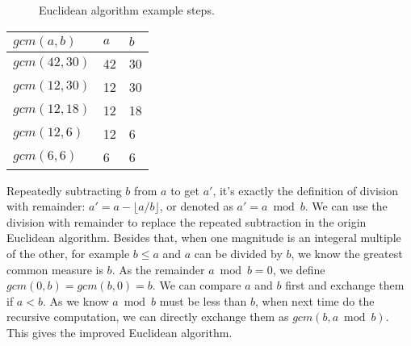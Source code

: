 \documentclass{article}
\begin{document}
\begin{figure}[htbp]
\centering
{}
\caption{Euclidean algorithm example steps.}
\label{fig:line-seg-gcm}
\end{figure}

\begin{tabular}{|l|l|l|}
\hline
$gcm(a, b)$ & $a$ & $b$ \\
\hline
$gcm(42, 30)$ & 42 & 30 \\
\hline
$gcm(12, 30)$ & 12 & 30 \\
\hline
$gcm(12, 18)$ & 12 & 18 \\
\hline
$gcm(12, 6)$ & 12 & 6 \\
\hline
$gcm(6, 6)$ & 6 & 6 \\
\hline
\end{tabular}

Repeatedly subtracting $b$ from $a$ to get $a'$, it's exactly the definition of division with remainder: $a' = a - \lfloor a / b \rfloor$, or denoted as $a'= a \bmod b$. We can use the division with remainder to replace the repeated subtraction in the origin Euclidean algorithm. Besides that, when one magnitude is an integeral multiple of the other, for example $b \leq a$ and $a$ can be divided by $b$, we know the greatest common measure is $b$. As the remainder $a \bmod b = 0$, we define $gcm(0, b) = gcm(b, 0) = b$. We can compare $a$ and $b$ first and exchange them if $a < b$. As we know $a \bmod b$ must be less than $b$, when next time do the recursive computation, we can directly exchange them as $gcm(b, a \bmod b)$. This gives the improved Euclidean algorithm.
\end{document}
